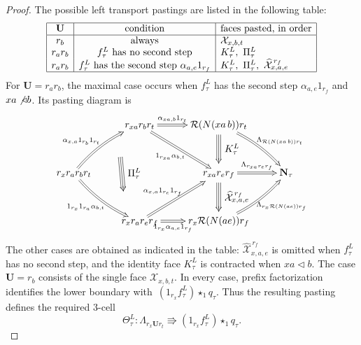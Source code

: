 \documentclass[a4paper, twoside, 11pt, english]{article}
\newcommand{\npath}[1]{\Lambda_{#1}}
\begin{document}
\begin{proof}
The possible left transport pastings are listed in the following table:
\[
\begin{array}{|c|c|l|}
\hline
\mathbf U
& \text{condition}
& \text{faces pasted, in order}
\\ \hline
r_b
& \text{always}
& \mathcal X_{x,b,t}
\\
r_ar_b
& f_\tau^L\text{ has no second step}
& K_\tau^L,\ \Pi_\tau^L
\\
r_ar_b
& f_\tau^L\text{ has the second step }
  \alpha_{a,e}1_{r_f}
& K_\tau^L,\ \Pi_\tau^L,\
  \widehat{\mathcal X}^{\,r_f}_{x,a,e}
\\ \hline
\end{array}
\]
For $\mathbf U=r_ar_b$, the maximal case occurs when
$f_\tau^L$ has the second step
$\alpha_{a,e}1_{r_f}$ and $xa\not\triangleleft b$. Its pasting diagram is
\[
\xymatrix @R=3.3em @C=2.5em {
&
r_{xa}r_br_t
  \ar@2[r]^-{\alpha_{xa,b}1_{r_t}}
  \ar@2[dr]_-{1_{r_{xa}}\alpha_{b,t}}
&
\Rr(N(xa\,b))r_t
  \ar@2@/^/[dr]^-{\npath{\Rr(N(xa\,b))r_t}}
  \ar@3[]!<0pt,-10pt>;[d]!<0pt,10pt>
    ^-*+{K_\tau^L}
&
\\
r_xr_ar_br_t
  \ar@2@/^/[ur]^-{\alpha_{x,a}1_{r_b}1_{r_t}}
    _-{}="pi-upper"
  \ar@2@/_/[dr]_-{1_{r_x}1_{r_a}\alpha_{b,t}}
    ^-{}="pi-lower"
  \ar@3 "pi-upper"!<22pt,-10pt>;
        "pi-lower"!<22pt,10pt>
    ^-*+{\Pi_\tau^L}
&&
r_{xa}r_er_f
  \ar@2[r]^-{\npath{r_{xa}r_er_f}}
  \ar@3[]!<0pt,-10pt>;[d]!<0pt,10pt>
    ^-*+{\widehat{\mathcal X}^{\,r_f}_{x,a,e}}
&
\mathbf N_\tau
\\
&
r_xr_ar_er_f
  \ar@2[ur]^-{\alpha_{x,a}1_{r_e}1_{r_f}}
  \ar@2[r]_-{1_{r_x}\alpha_{a,e}1_{r_f}}
&
r_x\Rr(N(ae))r_f
  \ar@2@/_/[ur]_-{\npath{r_x\Rr(N(ae))r_f}}
&
}
\]
The other cases are obtained as indicated in the table:
$\widehat{\mathcal X}^{\,r_f}_{x,a,e}$ is omitted when
$f_\tau^L$ has no second step, and the identity face $K_\tau^L$ is
contracted when $xa\triangleleft b$. The case $\mathbf U=r_b$ consists
of the single face $\mathcal X_{x,b,t}$. In every case, prefix
factorization identifies the lower boundary with~$(1_{r_x}f_\tau^L)\star_1q_\tau$.
Thus the resulting pasting defines the required $3$-cell
\[
\Theta_\tau^L\colon
\npath{r_x\mathbf U r_t}
\Rrightarrow
(1_{r_x}f_\tau^L)\star_1q_\tau.
\]


\end{proof}
\end{document}
